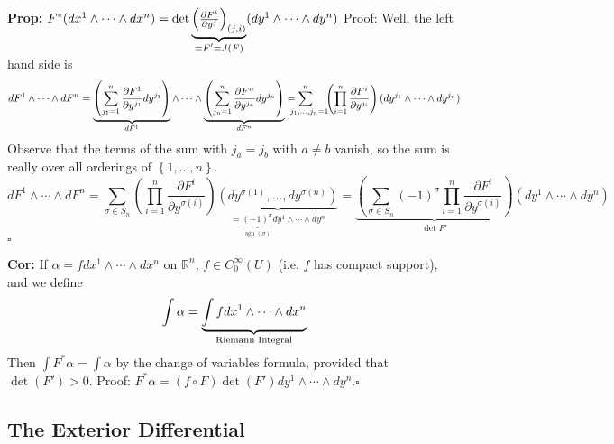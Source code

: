 \documentclass[10pt,letterpaper]{article}
\newcommand{\n}{\hfill\break}
\newcommand{\nn}{\vspace{0.5\baselineskip}\n}
\newcommand{\hangblock}[2]{\par\noindent\settowidth{\hangindent}{\textbf{#1: }}\textbf{#1: }\nolinebreak#2}
\newcommand{\cor}[1]{\hangblock{Cor}{#1}}
\newcommand{\prop}[1]{\hangblock{Prop}{#1}}
\newcommand{\proven}{\;$\square$\n}
\newcommand{\ptxt}[1]{\textrm{\textnormal{#1}}}
\newcommand{\set}[1]{\left\{#1\right\}}
\newcommand{\reals}{\mathbb{R}}
\newcommand{\R}{\reals}
\newcommand{\of}{\circ}
\DeclareMathOperator{\sgn}{sgn}
\newcommand{\pd}[2]{\frac{\partial{}#1}{\partial{}#2}}
\newcommand{\paren}[1]{\left(#1\right)}
\begin{document}
\prop{
	$F^{*}(dx^{1}\wedge\cdots\wedge{}dx^{n})=\det\underbrace{\begin{pmatrix}\pd{F^{i}}{y^{j}}\end{pmatrix}_{(j,i)}}_{\mathclap{=F'=J(F)}}(dy^{1}\wedge\cdots\wedge{}dy^{n})$\nn
	Proof: Well, the left hand side is
	\[
		dF^{1}\wedge\cdots\wedge{}dF^{n}=\underbrace{\paren{\sum_{j_{1}=1}^{n}\pd{F^{1}}{y^{j_{1}}}dy^{j_{1}}}}_{dF^{1}}\wedge\cdots\wedge\underbrace{\paren{\sum_{j_{n}=1}^{n}\pd{F^{n}}{y^{j_{n}}}dy^{j_{n}}}}_{dF^{n}}=\sum_{\hspace{-3em}\mathrlap{j_{1},\ldots,j_{n}=1}}^{n}\;\;\;\;\paren{\prod_{i=1}^{n}\pd{F^{i}}{y^{j_{i}}}}(dy^{j_{1}}\wedge\cdots\wedge{}dy^{j_{n}})
	\]
	Observe that the terms of the sum with $j_{a}=j_{b}$ with $a\ne{}b$ vanish, so the sum is really over all orderings of $\set{1,\ldots,n}$.
	\[
		dF^{1}\wedge\cdots\wedge{}dF^{n}=\sum_{\sigma\in{}S_{n}}\paren{\prod_{i=1}^{n}\pd{F^{i}}{y^{\sigma(i)}}}\underbrace{\paren{dy^{\sigma(1)},\ldots,dy^{\sigma(n)}}}_{=\underbrace{(-1)^{\sigma}}_{\sgn(\sigma)}dy^{1}\wedge\cdots\wedge{}dy^{n}}=\underbrace{\paren{\sum_{\sigma\in{}S_{n}}(-1)^{\sigma}\prod_{i=1}^{n}\pd{F^{i}}{y^{\sigma(i)}}}}_{\det{}F'}\paren{dy^{1}\wedge\cdots\wedge{}dy^{n}}
	\]
	\proven
}

\cor{
	If $\alpha=fdx^{1}\wedge\cdots\wedge{}dx^{n}$ on $\R^{n}$, $f\in{}C^{\infty}_{0}(U)$ (i.e. $f$ has compact support), and we define
	\[
		\int\alpha=\underbrace{\int{}fdx^{1}\wedge\cdots\wedge{}dx^{n}}_{\ptxt{Riemann Integral}}
	\]
	Then $\int{}F^{*}\alpha=\int\alpha$ by the change of variables formula, provided that $\det(F')>0$.\nn
	Proof: $F^{*}\alpha=(f\of{}F)\det(F')dy^{1}\wedge\cdots\wedge{}dy^{n}$.\proven
}

\newpage
\subsection*{The Exterior Differential}
\end{document}
